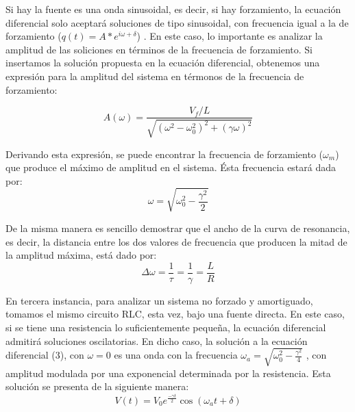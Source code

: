 \documentclass[%
 reprint,
 amsmath,amssymb,
 aps,
]{revtex4-1}
\begin{document}
Si hay la fuente es una onda sinusoidal, es decir, si hay forzamiento, la ecuaci\'on diferencial solo aceptar\'a soluciones de tipo sinusoidal, con frecuencia igual a la de forzamiento ($q(t) = A*e^{i\omega + \delta}$) . En este caso, lo importante es analizar la amplitud de las soliciones en t\'erminos de la frecuencia de forzamiento. Si insertamos la soluci\'on propuesta en la ecuaci\'on diferencial, obtenemos una expresi\'on para la amplitud del sistema en t\'ermonos de la frecuencia de forzamiento:

\begin{equation}
A(\omega) = \frac{V_f/L}{\sqrt{(\omega^2 - \omega_0^2)^2 + (\gamma\omega)^2}}
\label{equation:amplitud}
\end{equation}

Derivando esta expresi\'on, se puede encontrar la frecuencia de forzamiento ($\omega_m$) que produce el m\'aximo de amplitud en el sistema. \'Esta frecuencia estar\'a dada por:\\

\begin{equation}
\omega = \sqrt{\omega_0^2 - \frac{\gamma^2}{2} }
\end{equation}

De la misma manera es sencillo demostrar que el ancho de la curva de resonancia, es decir, la distancia entre los dos valores de frecuencia que producen la mitad de la amplitud m\'axima, est\'a dado por:\\

\begin{equation}
\Delta\omega = \frac{1}{\tau} = \frac{1}{\gamma} = \frac{L}{R}
\end{equation}

En tercera instancia, para analizar un sistema no forzado y amortiguado, tomamos el mismo circuito RLC, esta vez, bajo una fuente directa. En este caso, si se tiene una resistencia lo suficientemente pequeña, la ecuaci\'on diferencial admitir\'a soluciones oscilatorias. En dicho caso, la solución a la ecuaci\'on diferencial (3), con $\omega = 0$  es una onda con la frecuencia $\omega_a = \sqrt{\omega_0^2 -\frac{\gamma^2}{4}}$ , con amplitud modulada por una exponencial determinada por la resistencia. Esta soluci\'on se presenta de la siguiente manera:\\

\begin{equation}
V(t) = V_0 e^{\frac{-\gamma t}{2}}\cos(\omega_a t + \delta)
\end{equation}
\end{document}
